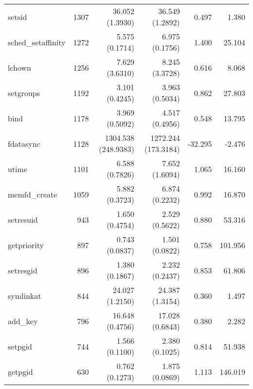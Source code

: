 \begin{longtable}{>{\ttfamily}lrrrrr}
                         setsid &       1307 &             36.052 (1.3930) &           36.549 (1.2892) &           0.497 &        1.380 \\
             sched\_setaffinity &       1272 &              5.575 (0.1714) &            6.975 (0.1756) &           1.400 &       25.104 \\
                         lchown &       1256 &              7.629 (3.6310) &            8.245 (3.3728) &           0.616 &        8.068 \\
                      setgroups &       1192 &              3.101 (0.4245) &            3.963 (0.5034) &           0.862 &       27.803 \\
                           bind &       1178 &              3.969 (0.5092) &            4.517 (0.4956) &           0.548 &       13.795 \\
                      fdatasync &       1128 &         1304.538 (248.9383) &       1272.244 (173.3184) &         -32.295 &       -2.476 \\
                          utime &       1101 &              6.588 (0.7826) &            7.652 (1.6094) &           1.065 &       16.160 \\
                  memfd\_create &       1059 &              5.882 (0.3723) &            6.874 (0.2232) &           0.992 &       16.870 \\
                      setresuid &        943 &              1.650 (0.4754) &            2.529 (0.5622) &           0.880 &       53.316 \\
                    getpriority &        897 &              0.743 (0.0837) &            1.501 (0.0822) &           0.758 &      101.956 \\
                      setresgid &        896 &              1.380 (0.1867) &            2.232 (0.2437) &           0.853 &       61.806 \\
                      symlinkat &        844 &             24.027 (1.2150) &           24.387 (1.3154) &           0.360 &        1.497 \\
                       add\_key &        796 &             16.648 (0.4756) &           17.028 (0.6843) &           0.380 &        2.282 \\
                        setpgid &        744 &              1.566 (0.1100) &            2.380 (0.1025) &           0.814 &       51.938 \\
                        getpgid &        630 &              0.762 (0.1273) &            1.875 (0.0869) &           1.113 &      146.019 \\

\end{longtable}
